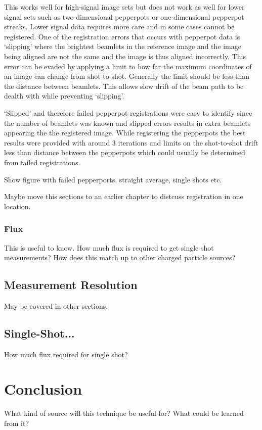 This works well for high-signal image sets but does not work as well for lower signal sets such as two-dimensional pepperpots or one-dimensional pepperpot streaks.
Lower signal data requires more care and in some cases cannot be registered.
One of the registration errors that occurs with pepperpot data is `slipping' where the brightest beamlets in the reference image and the image being aligned are not the same and the image is thus aligned incorrectly.
This error can be evaded by applying a limit to how far the maximum coordinates of an image can change from shot-to-shot.
Generally the limit should be less than the distance between beamlets.
This allows slow drift of the beam path to be dealth with while preventing `slipping'.

`Slipped' and therefore failed pepperpot registrations were easy to identify since the number of beamlets was known and slipped errors results in extra beamlets appearing the the registered image.
While registering the pepperpots the best results were provided with around 3 iterations and limits on the shot-to-shot drift less than distance between the pepperpots which could usually be determined from failed registrations.

{\color{red}Show figure with failed pepperports, straight average, single shots etc.

Maybe move this sections to an earlier chapter to distcuss registration in one location.}

\subsubsection{Flux}

This is useful to know.
How much flux is required to get single shot measurements?
How does this match up to other charged particle sources?

\subsection{Measurement Resolution}

May be covered in other sections.


\subsection{Single-Shot...}

How much flux required for single shot?

\section{Conclusion}
What kind of source will this technique be useful for?
What could be learned from it?
